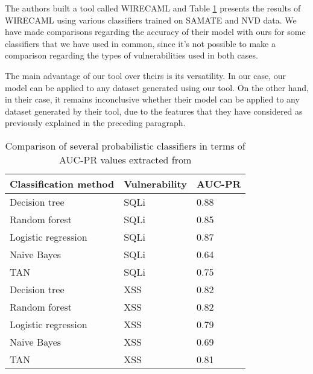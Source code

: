 The authors built a tool called WIRECAML \cite{Kronjee2018} and Table \ref{tab:kronj_res_tab} presents the results of WIRECAML using various classifiers trained on SAMATE and NVD data. We have made comparisons regarding the accuracy of their model with ours for some classifiers that we have used in common, since it's not possible to make a comparison regarding the types of vulnerabilities used in both cases.

The main advantage of our tool over theirs is its versatility. In our case, our model can be applied to any dataset generated using our tool. On the other hand, in their case, it remains inconclusive whether their model can be applied to any dataset generated by their tool, due to the features that they have considered as previously explained in the preceding paragraph.

\begin{table}[!ht]
    \centering
    \caption{Comparison of several probabilistic classifiers in terms of AUC-PR values extracted from \cite{Kronjee2018}}
    \begin{tabular}{|l|l|l|}
    \hline
        \textbf{Classification method} & \textbf{Vulnerability} & \textbf{AUC-PR} \\ \hline
        Decision tree & SQLi & 0.88 \\ \hline
        Random forest & SQLi & 0.85 \\ \hline
        Logistic regression & SQLi & 0.87 \\ \hline
        Naive Bayes & SQLi & 0.64 \\ \hline
        TAN & SQLi & 0.75 \\ \hline
        Decision tree & XSS & 0.82 \\ \hline
        Random forest & XSS & 0.82 \\ \hline
        Logistic regression & XSS & 0.79 \\ \hline
        Naive Bayes & XSS & 0.69 \\ \hline
        TAN & XSS & 0.81 \\ \hline
    \end{tabular}
    \label{tab:kronj_res_tab}
\end{table}



